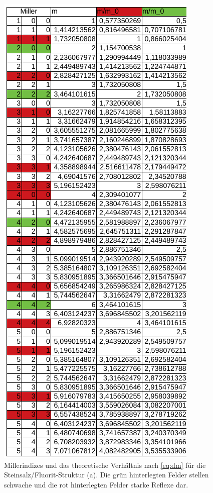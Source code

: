 

\begin{figure}
  \centering
  \includegraphics{ressources/Steinsalz.png}
  \caption{Millerindizes und das theoretische Verhältnis nach \ref{eq:dm} für die Steinsalz/Fluorit-Struktur (a). Die grün hinterlegten Felder stellen schwache und die rot hinterlegten Felder starke Reflexe dar.}
  \label{fig:Anhang1}
\end{figure}

